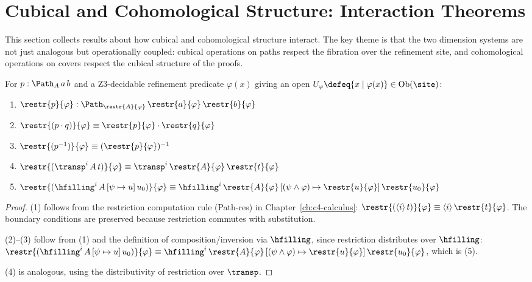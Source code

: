 \section{Cubical and Cohomological Structure: Interaction Theorems}
\label{sec:cubical-fibers}

This section collects results about how cubical and cohomological structure
interact.  The key theme is that the two dimension systems are not just
analogous but operationally coupled: cubical operations on paths respect
the fibration over the refinement site, and cohomological operations on
covers respect the cubical structure of the proofs.

\begin{proposition}
\label{prop:restr-path}
For $p : \Path_A\, a\, b$ and a Z3-decidable refinement predicate
$\varphi(x)$ giving an open $U_\varphi \defeq \{x \mid \varphi(x)\}
\in \mathrm{Ob}(\site)$:
\begin{enumerate}
\item $\restr{p}{\varphi} : \Path_{\restr{A}{\varphi}}\,
  \restr{a}{\varphi}\, \restr{b}{\varphi}$
\item $\restr{(p \cdot q)}{\varphi} \equiv \restr{p}{\varphi}
  \cdot \restr{q}{\varphi}$
\item $\restr{(p^{-1})}{\varphi} \equiv (\restr{p}{\varphi})^{-1}$
\item $\restr{(\transp^i\, A\, t)}{\varphi} \equiv
  \transp^i\, \restr{A}{\varphi}\, \restr{t}{\varphi}$
\item $\restr{(\hfilling^i\, A\, [\psi \mapsto u]\, u_0)}{\varphi}
  \equiv \hfilling^i\, \restr{A}{\varphi}\,
  [(\psi \wedge \varphi) \mapsto \restr{u}{\varphi}]\,
  \restr{u_0}{\varphi}$
\end{enumerate}
\end{proposition}

\begin{proof}
(1) follows from the restriction computation rule (Path-res) in
Chapter~\ref{ch:c4-calculus}: $\restr{(\langle i \rangle\, t)}{\varphi}
\equiv \langle i \rangle\, \restr{t}{\varphi}$.  The boundary conditions
are preserved because restriction commutes with substitution.

(2)--(3) follow from (1) and the definition of composition/inversion
via $\hfilling$, since restriction distributes over $\hfilling$:
$\restr{(\hfilling^i\, A\, [\psi \mapsto u]\, u_0)}{\varphi} \equiv
\hfilling^i\, \restr{A}{\varphi}\, [(\psi \wedge \varphi) \mapsto
\restr{u}{\varphi}]\, \restr{u_0}{\varphi}$, which is (5).

(4) is analogous, using the distributivity of restriction over $\transp$.
\end{proof}

